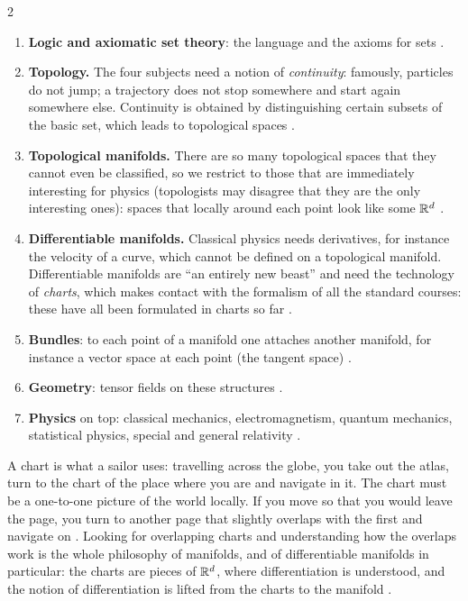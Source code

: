 \begin{paracol}{2}
\begin{enumerate}
  \item \textbf{Logic and axiomatic set theory}: the language and the axioms for sets .
  \item \textbf{Topology.} The four subjects need a notion of \emph{continuity}: famously, particles do not
        jump; a trajectory does not stop somewhere and start again somewhere else. Continuity is obtained by
        distinguishing certain subsets of the basic set, which leads to topological spaces .
  \item \textbf{Topological manifolds.} There are so many topological spaces that they cannot even be
        classified, so we restrict to those that are immediately interesting for physics (topologists may
        disagree that they are the only interesting ones): spaces that locally around each point look like
        some $\mathbb{R}^d$ .
  \item \textbf{Differentiable manifolds.} Classical physics needs derivatives, for instance the velocity of a
        curve, which cannot be defined on a topological manifold. Differentiable manifolds are ``an entirely
        new beast'' and need the technology of \emph{charts}, which makes contact with the formalism of all
        the standard courses: these have all been formulated in charts so far .
  \item \textbf{Bundles}: to each point of a manifold one attaches another manifold, for instance a vector
        space at each point (the tangent space) .
  \item \textbf{Geometry}: tensor fields on these structures .
  \item \textbf{Physics} on top: classical mechanics, electromagnetism, quantum mechanics, statistical physics,
        special and general relativity .
\end{enumerate}

\begin{intuition}
A chart is what a sailor uses: travelling across the globe, you take out the atlas, turn to the chart of the
place where you are and navigate in it. The chart must be a one-to-one picture of the world locally. If you
move so that you would leave the page, you turn to another page that slightly overlaps with the first and
navigate on . Looking for overlapping charts and understanding how the overlaps work is the
whole philosophy of manifolds, and of differentiable manifolds in particular: the charts are pieces of
$\mathbb{R}^d$, where differentiation is understood, and the notion of differentiation is lifted from the charts to
the manifold .
\end{intuition}


\end{paracol}
